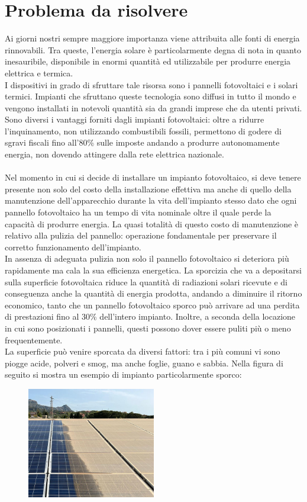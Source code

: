 \documentclass[a4paper, 12pt]{article}
\begin{document}
	\newpage
	\section{Problema da risolvere}
	Ai giorni nostri sempre maggiore importanza viene attribuita alle fonti di energia rinnovabili. Tra queste, l'energia solare è particolarmente degna di nota in quanto inesauribile, disponibile in enormi quantità ed utilizzabile per produrre energia elettrica e termica.\\
	I dispositivi in grado di sfruttare tale risorsa sono i pannelli fotovoltaici e i solari termici. Impianti che sfruttano queste tecnologia sono diffusi in tutto il mondo e vengono installati in notevoli quantità sia da grandi imprese che da utenti privati. Sono diversi i vantaggi forniti dagli impianti fotovoltaici: oltre a ridurre l'inquinamento, non utilizzando combustibili fossili, permettono di godere di sgravi fiscali fino all'80\% sulle imposte andando a produrre autonomamente energia, non dovendo attingere dalla rete elettrica nazionale.\\\\
	Nel momento in cui si decide di installare un impianto fotovoltaico, si deve tenere presente non solo del costo della installazione effettiva ma anche di quello della manutenzione dell'apparecchio durante la vita dell'impianto stesso dato che ogni pannello fotovoltaico ha un tempo di vita nominale oltre il quale perde la capacità di produrre energia. La quasi totalità di questo costo di manutenzione è relativo alla pulizia del pannello: operazione fondamentale per preservare il corretto funzionamento dell'impianto.\\
	In assenza di adeguata pulizia non solo il pannello fotovoltaico si deteriora più rapidamente ma cala la sua efficienza energetica. La sporcizia che va a depositarsi sulla superficie fotovoltaica riduce la quantità di radiazioni solari ricevute e di conseguenza anche la quantità di energia prodotta, andando a diminuire il ritorno economico, tanto che un pannello fotovoltaico sporco può arrivare ad una perdita di prestazioni fino al 30\% dell'intero impianto. Inoltre, a seconda della locazione in cui sono posizionati i pannelli, questi possono dover essere puliti più o meno frequentemente.\\
	La superficie può venire sporcata da diversi fattori: tra i più comuni vi sono piogge acide, polveri e smog, ma anche foglie, guano e sabbia. Nella figura di seguito si mostra un esempio di impianto particolarmente sporco:
	\begin{figure}[h]
		\centering\includegraphics[width=0.5\textwidth]{Images/pannelli_sporchi2.jpg}
	\end{figure}\\
\end{document}
